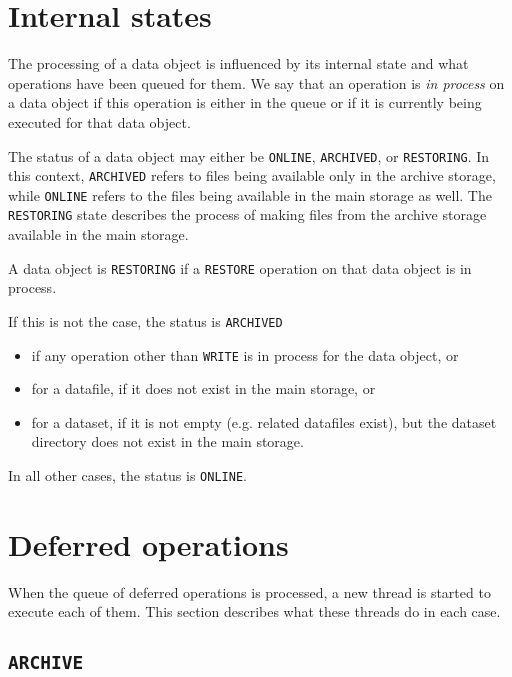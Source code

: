 \documentclass[paper=a4]{scrartcl}
\begin{document}
\section{Internal states}
\label{sec:states}

The processing of a data object is influenced by its internal state
and what operations have been queued for them.  We say that an
operation is \emph{in process} on a data object if this operation is
either in the queue or if it is currently being executed for that
data object.

The status of a data object may either be \texttt{ONLINE},
\texttt{ARCHIVED}, or \texttt{RESTORING}.  In this context,
\texttt{ARCHIVED} refers to files being available only in the archive
storage, while \texttt{ONLINE} refers to the files being available in
the main storage as well.  The \texttt{RESTORING} state describes the
process of making files from the archive storage available in the
main storage.

A data object is \texttt{RESTORING} if a \texttt{RESTORE}
operation on that data object is in process.

If this is not the case, the status is \texttt{ARCHIVED}
\begin{itemize}[noitemsep,topsep=0pt]
\item if any operation other than \texttt{WRITE} is in process
for the data object, or
\item for a datafile, if it does not exist in the main storage, or
\item for a dataset, if it is not empty (e.g. related datafiles
exist), but the dataset directory does not exist in the main storage.
\end{itemize}

In all other cases, the status is \texttt{ONLINE}.


\section{Deferred operations}
\label{sec:defops}

When the queue of deferred operations is processed, a new thread is
started to execute each of them.  This section describes what these
threads do in each case.

\subsection{\texttt{ARCHIVE}}
\label{sec:defops:archive}
\end{document}
